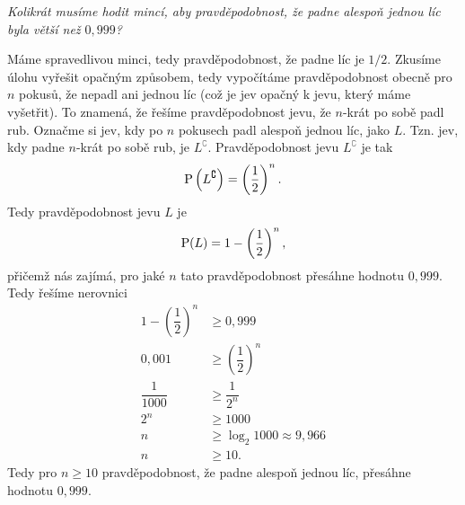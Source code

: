 \begin{task}
    \textit{Kolikrát musíme hodit mincí, aby pravděpodobnost, že padne alespoň jednou líc byla větší než $0{,}999$?} \citep[str. 171]{Petakova2020}
\end{task}
\begin{solution}
    Máme spravedlivou minci, tedy pravděpodobnost, že padne líc je $1/2$. Zkusíme úlohu vyřešit opačným způsobem, tedy vypočítáme pravděpodobnost obecně pro $n$ pokusů, že nepadl ani jednou líc (což je jev opačný k jevu, který máme vyšetřit). To znamená, že řešíme pravděpodobnost jevu, že $n$-krát po sobě padl rub. Označme si jev, kdy po $n$ pokusech padl alespoň jednou líc, jako $L$. Tzn. jev, kdy padne $n$-krát po sobě rub, je $L^\complement$. Pravděpodobnost jevu $L^\complement$ je tak
    \[\operatorname{\text{P}}\left(L^\complement\right)=\left(\dfrac{1}{2}\right)^n.\]
    Tedy pravděpodobnost jevu $L$ je
    \[\operatorname{\text{P}}(L)=1-\left(\dfrac{1}{2}\right)^n,\]
    přičemž nás zajímá, pro jaké $n$ tato pravděpodobnost přesáhne hodnotu $0{,}999$. Tedy řešíme nerovnici
    \begin{align*}
        1-\left(\dfrac{1}{2}\right)^n&\geqslant 0{,}999\\
        0{,}001&\geqslant\left(\dfrac{1}{2}\right)^n\\
        \dfrac{1}{1000}&\geqslant\dfrac{1}{2^n}\\
        2^n&\geqslant 1000\\
        n&\geqslant\log_2{1000}\approx 9{,}966\\
        n&\geqslant 10.
    \end{align*}
    Tedy pro $n\geqslant 10$ pravděpodobnost, že padne alespoň jednou líc, přesáhne hodnotu $0{,}999$.
\end{solution}